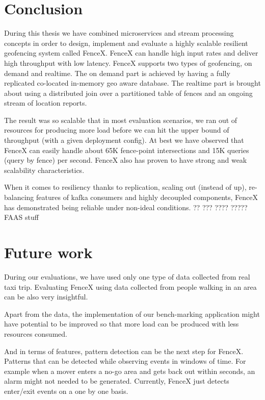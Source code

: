 \documentclass[a4]{report}
\begin{document}
    \clearpage


    \chapter{Conclusion}
    During this thesis we have combined microservices and stream processing concepts in order to design, implement
    and evaluate a highly scalable resilient geofencing system called FenceX.
    FenceX can handle high input rates and deliver high throughput with low latency.
    FenceX supports two types of geofencing, on demand and realtime.
    The on demand part is achieved by having a fully replicated co-located in-memory geo aware database.
    The realtime part is brought about using a distributed join over a partitioned table of fences and an ongoing
    stream of location reports.

    The result was so scalable that in most evaluation scenarios, we ran out of resources for producing more load
    before we can hit the upper bound of throughput (with a given deployment config).
    At best we have observed that FenceX can easily handle about 65K fence-point intersections and 15K queries (query by
    fence) per second.
    FenceX also has proven to have strong and weak scalability characteristics.

    When it comes to resiliency thanks to replication, scaling out (instead of up), re-balancing features of kafka
    consumers and highly decoupled components, FenceX has demonstrated being reliable under non-ideal conditions.
    ??
    ???
    ????
    ?????FAAS stuff


    \chapter{Future work}
    During our evaluations, we have used only one type of data collected from real taxi trip.
    Evaluating FenceX using data collected from people walking in an area can be also very insightful.

    Apart from the data, the implementation of our bench-marking application might have potential to be improved so
    that more load can be produced with less resources consumed.

    And in terms of features, pattern detection can be the next step for FenceX.
    Patterns that can be detected while observing events in windows of time.
    For example when a mover enters a no-go area and gets back out within seconds, an alarm might not needed to be
    generated.
    Currently, FenceX just detects enter/exit events on a one by one basis.
\end{document}
